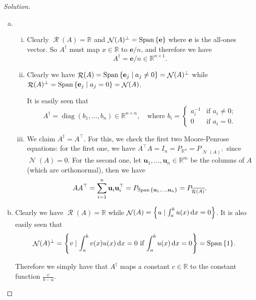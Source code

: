 \documentclass{article}
\theoremstyle{plain}
\theoremstyle{remark}
\newenvironment{solution}{\begin{proof}[Solution]\renewcommand\qedsymbol{}}{\end{proof}}
\renewcommand{\vec}{\mathbf}
\newcommand{\Bb}{\mathbb}
\newcommand{\Cal}{\mathcal}
\newcommand{\RR}{\Bb R}
\newcommand{\T}{^\top} %
\renewcommand{\P}{^\perp}
\newcommand{\D}{^\dagger}
\newcommand\clos\overline
\DeclareMathOperator{\Span}{Span}
\DeclareMathOperator\Nul{\Cal N}
\DeclareMathOperator\Ran{\Cal R}
\DeclareMathOperator\diag{diag}
\begin{document}
\begin{solution}
	\begin{enumerate}[(a)]
		\item \begin{enumerate}[(i)]
			\item Clearly $\Ran(A) = \RR$ and $\Nul(A)\P = \Span\qty{\vec e}$ where $\vec e$ is the all-ones vector. So $A\D$ must map $x \in \RR$ to $\vec e/n$, and therefore we have
			\[
			A\D = \vec e/n \in \RR^{n \times 1}.
			\]
			
			\item Clearly we have $\Ran(A) = \Span\qty{\vec e_j \mid a_j \neq 0} = \Nul(A)\P$ while $\Ran(A)\P = \Span\qty{\vec e_j \mid a_j = 0} = \Nul(A)$. 
			
			It is easily seen that
			\[
			A\D = \diag(b_1, \dotsc, b_n) \in \RR^{n \times n}, \quad\text{where } b_i = \begin{cases}
				a_i^{-1} &\text{if $a_i \neq 0$}; \\
				0 &\text{if $a_i = 0$}. 
			\end{cases}
			\]
			
			\item 
			We claim $A\D = A\T$. For this, we check the first two Moore-Penrose equations: for the first one, we have $A\T A = I_n = P_{\RR^n} = P_{\Nul(A)\P}$ since $\Nul(A) = \qty{0}$.  
			For the second one, let $\vec u_1, \dotsc, \vec u_n \in \RR^m$ be the columns of $A$ (which are orthonormal), then we have
			\[
			AA\T = \sum_{i=1}^n \vec u_i \vec u_i\T = P_{\Span\qty{\vec u_1, \dotsc, \vec u_n}} = P_{\clos{\Ran(A)}}. 
			\]
		\end{enumerate}
	
	\item Clearly we have $\Ran(A) = \RR$ while $\Nul(A) = \qty{u \mid \int_a^b u(x) \dd{x} = 0}$. It is also easily seen that 
	\[
	\Nul(A)\P = \qty{v \mid \int_a^b v(x) u(x) \dd{x} = 0 \text{ if $\int_a^b u(x) \dd{x} = 0$}} = \Span\qty{1}. 
	\]
	
	Therefore we simply have that $A\D$ maps a constant $c \in \RR$ to the constant function $\frac{c}{b-a}$. 
	\end{enumerate}
\end{solution}
\end{document}
